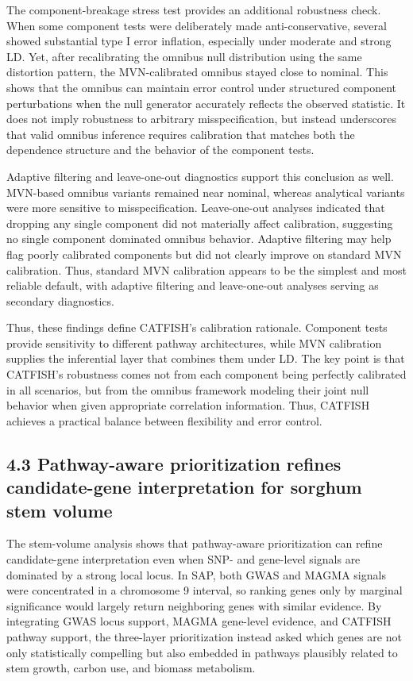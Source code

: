 \documentclass[unnumsec,webpdf,contemporary,large]{oup-authoring-template}%
\theoremstyle{thmstyleone}%
\theoremstyle{thmstyletwo}%
\theoremstyle{thmstylethree}%
\begin{document}
The component-breakage stress test provides an additional robustness check. When some component tests were deliberately made anti-conservative, several showed substantial type I error inflation, especially under moderate and strong LD. Yet, after recalibrating the omnibus null distribution using the same distortion pattern, the MVN-calibrated omnibus stayed close to nominal. This shows that the omnibus can maintain error control under structured component perturbations when the null generator accurately reflects the observed statistic. It does not imply robustness to arbitrary misspecification, but instead underscores that valid omnibus inference requires calibration that matches both the dependence structure and the behavior of the component tests.

Adaptive filtering and leave-one-out diagnostics support this conclusion as well. MVN-based omnibus variants remained near nominal, whereas analytical variants were more sensitive to misspecification. Leave-one-out analyses indicated that dropping any single component did not materially affect calibration, suggesting no single component dominated omnibus behavior. Adaptive filtering may help flag poorly calibrated components but did not clearly improve on standard MVN calibration. Thus, standard MVN calibration appears to be the simplest and most reliable default, with adaptive filtering and leave-one-out analyses serving as secondary diagnostics.

Thus, these findings define CATFISH's calibration rationale. Component tests provide sensitivity to different pathway architectures, while MVN calibration supplies the inferential layer that combines them under LD. The key point is that CATFISH's robustness comes not from each component being perfectly calibrated in all scenarios, but from the omnibus framework modeling their joint null behavior when given appropriate correlation information. Thus, CATFISH achieves a practical balance between flexibility and error control.


\subsection*{4.3 Pathway-aware prioritization refines candidate-gene interpretation for sorghum stem volume}

The stem-volume analysis shows that pathway-aware prioritization can refine candidate-gene interpretation even when SNP- and gene-level signals are dominated by a strong local locus. In SAP, both GWAS and MAGMA signals were concentrated in a chromosome 9 interval, so ranking genes only by marginal significance would largely return neighboring genes with similar evidence. By integrating GWAS locus support, MAGMA gene-level evidence, and CATFISH pathway support, the three-layer prioritization instead asked which genes are not only statistically compelling but also embedded in pathways plausibly related to stem growth, carbon use, and biomass metabolism.
\end{document}

